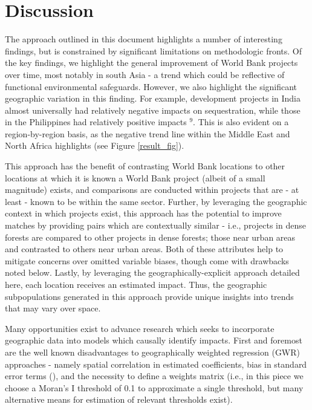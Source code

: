 \documentclass{article}\usepackage[]{graphicx}\usepackage[]{color}
\newenvironment{knitrout}{}{}  %
\begin{document}
\begin{knitrout}
\section{Discussion}
The approach outlined in this document highlights a number of interesting findings, but is constrained by significant limitations on methodologic fronts.
Of the key findings, we highlight the general improvement of World Bank projects over time, most notably in south Asia - a trend which could be reflective of functional environmental safeguards.  
However, we also highlight the significant geographic variation in this finding.  For example, development projects in India almost universally had relatively negative impacts on sequestration, while those in the Philippines had relatively positive impacts \begin{math}^{9}\end{math}.  
This is also evident on a region-by-region basis, as the negative trend line within the Middle East and North Africa highlights (see Figure \ref{result_fig}).  
\par
This approach has the benefit of contrasting World Bank locations to other locations at which it is known a World Bank project (albeit of a small magnitude) exists, and comparisons are conducted within projects that are - at least - known to be within the same sector. 
Further, by leveraging the geographic context in which projects exist, this approach has the potential to improve matches by providing pairs which are contextually similar - i.e., projects in dense forests are compared to other projects in dense forests; those near urban areas and contrasted to others near urban areas.
Both of these attributes help to mitigate concerns over omitted variable biases, though come with drawbacks noted below.
Lastly, by leveraging the geographically-explicit approach detailed here, each location receives an estimated impact.
Thus, the geographic subpopulations generated in this approach provide unique insights into trends that may vary over space.
\par
Many opportunities exist to advance research which seeks to incorporate geographic data into models which causally identify impacts.
First and foremost are the well known disadvantages to geographically weighted regression (GWR) approaches - namely spatial correlation in estimated coefficients, bias in standard error terms (\cite{wheeler_multicollinearity_2005}), and the necessity to define a weights matrix (i.e., in this piece we choose a Moran's I threshold of 0.1 to approximate a single threshold, but many alternative means for estimation of relevant thresholds exist).  

\end{knitrout}
\end{document}
